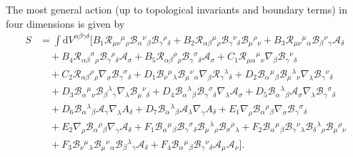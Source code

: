 \documentclass{article}
\begin{document}
The most general action (up to topological invariants and boundary terms) in four dimensions is given by
\begin{equation}
    \label{PAG_action}
\begin{split}
S & =
    \int  \mathrm{d}V^{\alpha \beta \gamma \delta} \bigg[
    B_1 \mathcal{R}_{\mu\nu}{}^{\mu}{}_{\rho}\mathcal{B}_{\alpha}{}^{\nu}{}_{\beta}\mathcal{B}_{\gamma}{}^{\rho}{}_{\delta}
    + B_2 \mathcal{R}_{\alpha\beta}{}^{\mu}{}_{\rho} \mathcal{B}_{\gamma}{}^{\nu}{}_{\delta} \mathcal{B}_{\mu}{}^{\rho}{}_{\nu}
    + B_3 \mathcal{R}_{\mu\nu}{}^{\mu}{}_{\alpha} \mathcal{B}_{\beta}{}^{\nu}{}_{\gamma} \mathcal{A}_\delta
    \\
    & \quad
    + B_4 \mathcal{R}_{\alpha\beta}{}^{\sigma}{}_{\rho}\mathcal{B}_{\gamma}{}^{\rho}{}_{\delta}\mathcal{A}_\sigma
    + B_5 \mathcal{R}_{\alpha \beta}{}^{\rho}{}_{\rho} \mathcal{B}_{\gamma}{}^{\sigma}{}_{\delta} \mathcal{A}_\sigma
    + C_1 \mathcal{R}_{\mu\alpha}{}^{\mu}{}_{\nu} \nabla_\beta \mathcal{B}_{\gamma}{}^{\nu}{}_{\delta}
    \\
    & \quad
    + C_2 \mathcal{R}_{\alpha\beta}{}^{\rho}{}_{\rho} \nabla_\sigma \mathcal{B}_{\gamma}{}^{\sigma}{}_{\delta}
    + D_1 \mathcal{B}_{\nu}{}^{\mu}{}_{\lambda} \mathcal{B}_{\mu}{}^{\nu}{}_{\alpha} \nabla_\beta \mathcal{R}_{\gamma}{}^{\lambda}{}_{\delta}
    + D_2 \mathcal{B}_{\alpha}{}^{\mu}{}_{\beta} \mathcal{B}_{\mu}{}^{\lambda}{}_{\nu} \nabla_{\lambda} \mathcal{B}_{\gamma}{}^{\nu}{}_{\delta}
    \\
    & \quad
    + D_3 \mathcal{B}_{\alpha}{}^{\mu}{}_{\nu}\mathcal{B}_{\beta}{}^{\lambda}{}_{\gamma} \nabla_\lambda \mathcal{B}_{\mu}{}^{\nu}{}_{\delta}
    + D_4 \mathcal{B}_{\alpha}{}^{\lambda}{}_{\beta}\mathcal{B}_{\gamma}{}^{\sigma}{}_{\delta}\nabla_\lambda \mathcal{A}_\sigma
    + D_5 \mathcal{B}_{\alpha}{}^{\lambda}{}_{\beta} \mathcal{A}_\sigma \nabla_\lambda \mathcal{B}_{\gamma}{}^{\sigma}{}_{\delta}
    \\
    &\quad
    + D_6 \mathcal{B}_{\alpha}{}^{\lambda}{}_{\beta}\mathcal{A}_\gamma \nabla_\lambda A_\delta
    + D_7\mathcal{B}_{\alpha}{}^{\lambda}{}_{\beta} \mathcal{A}_\lambda \nabla_\gamma A_\delta
    + E_1\nabla_\rho \mathcal{B}_{\alpha}{}^{\rho}{}_{\beta} \nabla_\sigma \mathcal{B}_{\gamma}{}^{\sigma}{}_{\delta}
    \\
    &\quad
    + E_2 \nabla_\rho \mathcal{B}_{\alpha}{}^{\rho}{}_{\beta} \nabla_\gamma \mathcal{A}_\delta
    + F_1 \mathcal{B}_{\alpha}{}^{\mu}{}_{\beta} \mathcal{B}_{\gamma}{}^{\sigma}{}_{\delta} \mathcal{B}_{\mu}{}^{\lambda}{}_{\rho} \mathcal{B}_{\sigma}{}^{\rho}{}_{\lambda}
    + F_2\mathcal{B}_{\alpha}{}^{\mu}{}_{\beta} \mathcal{B}_{\gamma}{}^{\nu}{}_{\lambda} \mathcal{B}_{\delta}{}^{\lambda}{}_{\rho} \mathcal{B}_{\mu}{}^{\rho}{}_{\nu}
    \\
    &\quad
    + F_3 \mathcal{B}_{\nu}{}^{\mu}{}_{\lambda} \mathcal{B}_{\mu}{}^{\nu}{}_{\alpha} \mathcal{B}_{\beta}{}^{\lambda}{}_{\gamma} \mathcal{A}_\delta
    + F_4 \mathcal{B}_{\alpha}{}^{\mu}{}_{\beta}\mathcal{B}_{\gamma}{}^{\nu}{}_{\delta}\mathcal{A}_\mu \mathcal{A}_\nu \bigg].
\end{split}
\end{equation}
\end{document}
